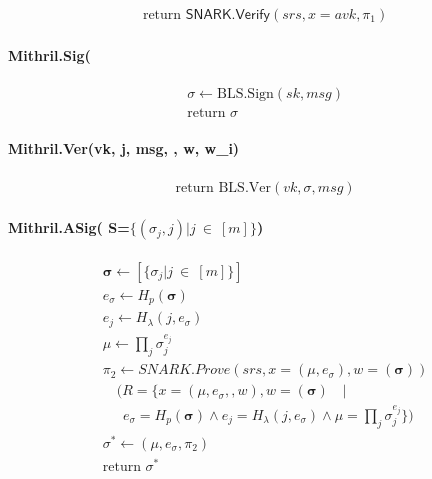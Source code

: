 \documentclass{article}
\begin{document}
\begin{align*}
&\text{return } \mathsf{SNARK.Verify}(srs, x = avk,\pi_1)
\end{align*}

\paragraph{Mithril.Sig(}
\begin{align*}
&\sigma \leftarrow \mathrm{BLS.Sign}(sk, msg) \\
&\text{return } \sigma
\end{align*}

\paragraph{Mithril.Ver(vk, j, msg, \sigma, w, w_i)}
\begin{align*}
&\text{return } \mathrm{BLS.Ver}(vk,\sigma, msg) 
\end{align*}

\paragraph{Mithril.ASig( S=$\{(\sigma_j,j) | j\  \in\  [m]\}$)}
\begin{align*}
&\boldsymbol{\sigma} \leftarrow [\{\sigma_j | j\  \in\  [m]\}] \\
&e_{\sigma} \leftarrow H_p(\boldsymbol{\sigma}) \\
&e_j \leftarrow H_\lambda(j, e_{\sigma}) \\
&\mu \leftarrow \prod_j \sigma_j^{e_j} \\
&\pi_2 \leftarrow SNARK.Prove(srs,x=(\mu, e_{\sigma}),w=(\boldsymbol{\sigma})) \\
&\quad (R = \{x=(\mu, e_{\sigma},,w),w=(\boldsymbol{\sigma})\quad|\quad \\
&\quad \ \ e_{\sigma} = H_p(\boldsymbol{\sigma}) \land e_j = H_\lambda(j, e_{\sigma}) \land \mu = \prod_j \sigma_j^{e_j} \})\\ 
&\sigma^* \leftarrow (\mu, e_{\sigma},\pi_2) \\
&\text{return } \sigma^* 
\end{align*}
\end{document}
